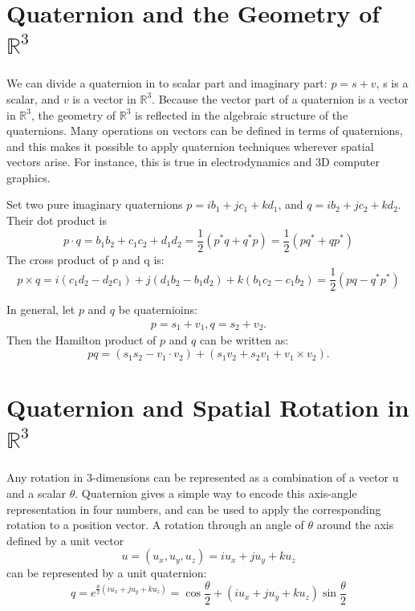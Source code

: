 \documentclass{article}
\begin{document}
\section{Quaternion and the Geometry of $\mathbb{R}^3$}

We can divide a quaternion in to scalar part and imaginary part: $p = s+v$, s is a scalar, and $v$ is a vector in $\mathbb{R}^3$. Because the vector part of a quaternion is a vector in $\mathbb{R}^3$, the geometry of $\mathbb{R}^3$ is reflected in the algebraic structure of the quaternions. Many operations on vectors can be defined in terms of quaternions, and this makes it possible to apply quaternion techniques wherever spatial vectors arise. For instance, this is true in electrodynamics and 3D computer graphics.

Set two pure imaginary quaternions $p = ib_1+jc_1+kd_1$, and $q = ib_2+jc_2+kd_2$. Their dot product is
\begin{displaymath}
  p \cdot q = b_1b_2+c_1c_2+d_1d_2
  = \frac{1}{2}(p^*q+q^*p) = \frac{1}{2}(pq^*+qp^*)
\end{displaymath}
The cross product of p and q is:
\begin{displaymath}
  p \times q = i(c_1d_2-d_2c_1)+j(d_1b_2-b_1d_2)+k(b_1c_2-c_1b_2)
  =\frac{1}{2}(pq-q^*p^*)
\end{displaymath}

In general, let $p$ and $q$ be quaternioins:
\begin{displaymath}
  \begin{split}
    p = s_1+v_1,
    q = s_2+v_2.
  \end{split}
\end{displaymath}
Then the Hamilton product of $p$ and $q$ can be written as:
\begin{displaymath}
  pq = (s_1s_2-v_1 \cdot v_2)+(s_1v_2+s_2v_1+v_1 \times v_2).
\end{displaymath}

\section{Quaternion and Spatial Rotation in $\mathbb{R}^3$}

Any rotation in 3-dimensions can be represented as a combination of a vector u and a scalar $\theta$. Quaternion gives a simple way to encode this axis-angle representation in four numbers, and can be used to apply the corresponding rotation to a position vector. A rotation through an angle of $\theta$ around the axis defined by a unit vector
\begin{displaymath}
  u = (u_x, u_y, u_z) = iu_x + ju_y + ku_z
\end{displaymath}
can be represented by a unit quaternion:
\begin{equation}
  q = e^{\frac{\theta}{2}(iu_x+ju_y+ku_z)} = \cos{\frac{\theta}{2}}+(iu_x+ju_y+ku_z)\sin{\frac{\theta}{2}}
\end{equation}
\end{document}
